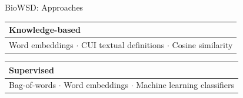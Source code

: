 \begin{frame}[t]{BioWSD: Approaches}

\vspace*{6mm}

\begingroup
\begin{tabular}{l}
{\large Knowledge-based}\\
\midrule
Word embeddings $\cdot$ CUI textual definitions $\cdot$ Cosine similarity\\
\end{tabular}
\endgroup

\bigskip
\bigskip
\bigskip

\begingroup
\begin{tabular}{l}
{\large Supervised}\\
\midrule
Bag-of-words $\cdot$ Word embeddings $\cdot$ Machine learning classifiers\\
\end{tabular}
\endgroup

\end{frame}
